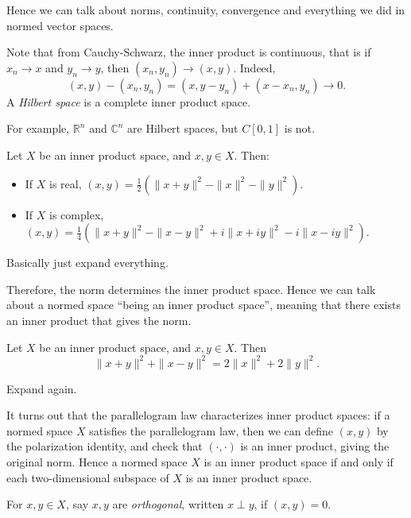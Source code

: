\documentclass[12pt]{article}
\begin{document}
Hence we can talk about norms, continuity, convergence and everything we did in normed vector spaces.

Note that from Cauchy-Schwarz, the inner product is continuous, that is if $x_n \to x$ and $y_n \to y$, then $(x_n, y_n) \to (x, y)$. Indeed,
\[
	(x, y) - (x_n, y_n) = (x, y-y_n) + (x-x_n, y_n) \to 0.
\]
A \emph{Hilbert space} is a complete inner product space.

For example, $\mathbb{R}^{n}$ and $\mathbb{C}^{n}$ are Hilbert spaces, but $C[0,1]$ is not.

\begin{proposition}
	Let $X$ be an inner product space, and $x, y \in X$. Then:
	\begin{itemize}
		\item If $X$ is real, $(x, y) = \frac{1}{2}(\|x+y\|^2 - \|x\|^2 - \|y\|^2)$.
		\item If $X$ is complex, $(x, y) = \frac{1}{4}(\|x+y\|^2 - \|x-y\|^2 + i \|x+iy\|^2 - i \|x-iy\|^2)$.
	\end{itemize}
\end{proposition}

\begin{proofbox}
	Basically just expand everything.
\end{proofbox}

Therefore, the norm determines the inner product space. Hence we can talk about a normed space ``being an inner product space'', meaning that there exists an inner product that gives the norm.

\begin{proposition}
	Let $X$ be an inner product space, and $x, y \in X$. Then
	\[
	\|x+y\|^2 + \|x-y\|^2 = 2 \|x\|^2 + 2\|y\|^2.
	\]
\end{proposition}

\begin{proofbox}
	Expand again.
\end{proofbox}

It turns out that the parallelogram law characterizes inner product spaces: if a normed space $X$ satisfies the parallelogram law, then we can define $(x, y)$ by the polarization identity, and check that $(\cdot, \cdot)$ is an inner product, giving the original norm. Hence a normed space $X$ is an inner product space if and only if each two-dimensional subspace of $X$ is an inner product space.

For $x, y \in X$, say $x, y$ are \emph{orthogonal}, written $x \perp y$, if $(x, y) = 0$.
\end{document}

